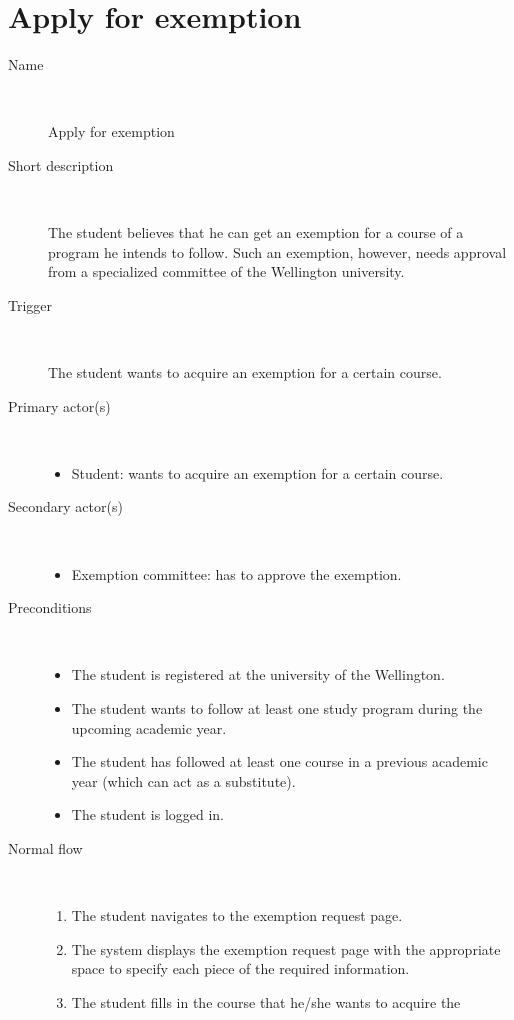 \section{Apply for exemption}

\begin{description}
	\item[Name] \
		\par Apply for exemption
	\item[Short description] \ 
			\par The student believes that he can get an exemption for a course of a
			program he intends to follow. Such an exemption, however, needs approval from
			a specialized committee of the Wellington university.
	\item[Trigger] \ 
			\par The student wants to acquire an exemption for a certain course.
	\item[Primary actor(s)] \ 
		\begin{itemize}
		  \item Student: wants to acquire an exemption for a certain course.
		\end{itemize}
	\item[Secondary actor(s)] \ 
		\begin{itemize}
		  \item Exemption committee: has to approve the exemption.
		\end{itemize} 
	\item[Preconditions] \ 
	\begin{itemize}
		\item The student is registered at the university of the Wellington.
		\item The student wants to follow at least one study program during the upcoming academic year.
		\item The student has followed at least one course in a previous academic year
		(which can act as a substitute).
		\item The student is logged in.
	\end{itemize}
	\item[Normal flow] \ 
	\begin{enumerate}
	  	\item The student navigates to the exemption request page.
	  	\item The system displays the exemption request page with the appropriate
	  	space to specify each piece of the required information.
	  	\item The student fills in the course that he/she wants to acquire the

\end{enumerate}
\end{description}
